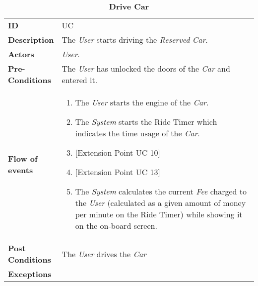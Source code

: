 \begin{longtable}{|p{0.2\linewidth} p{0.8\linewidth}|}
	\captionsetup{labelformat=empty} %
	\caption{\textbf{Drive Car}} %
	\label{UC_DriveCar}%
	\\ \hline %
	
	\textbf{ID} & UC\theUseCaseIdCounter \\ \hline
	\textbf{Description} & The \emph{User} starts driving the \emph{Reserved} \emph{Car}. \\ \hline
	\textbf{Actors} & \emph{User}.\\ \hline
	\textbf{Pre-Conditions} & The \emph{User} has unlocked the doors of the \emph{Car} and entered it. \\ \hline
	\textbf{Flow of events} & 
	\begin{enumerate}
		\item The \emph{User} starts the engine of the \emph{Car}.
		\item The \emph{System} starts the Ride Timer which indicates the time usage of the \emph{Car}.
		\item {[}Extension Point UC 10{]}
		\item {[}Extension Point UC 13{]}
		\item The \emph{System} calculates the current \emph{Fee} charged to the \emph{User} (calculated as a given amount of money per minute on the Ride Timer) while showing it on the on-board screen.
	\end{enumerate}	 \\ \hline
	\textbf{Post Conditions} & The \emph{User} drives the \emph{Car} \\ \hline
	\textbf{Exceptions} & \\ \hline
\end{longtable}

